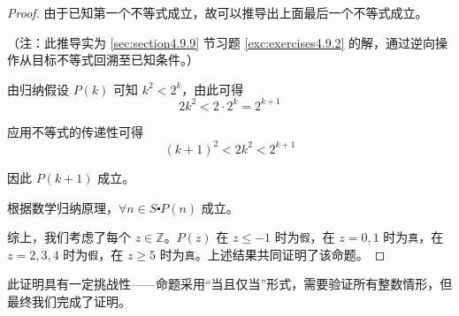 \begin{example}[比较 $2^n$ 与 $n^2$ 的大小]
\begin{proof}
        由于已知第一个不等式成立，故可以推导出上面最后一个不等式成立。

        （注：此推导实为 \ref{sec:section4.9.9} 节习题 \ref{exc:exercises4.9.2} 的解，通过逆向操作从目标不等式回溯至已知条件。）

        由归纳假设 $P(k)$ 可知 $k^2 < 2^k$，由此可得
        \[2k^2 < 2 \cdot 2^k = 2^{k+1}\]

        应用不等式的传递性可得
        \[(k + 1)^2 < 2k^2 < 2^{k+1}\]

        因此 $P(k+1)$ 成立。

        根据数学归纳原理，$\forall n \in S \centerdot P(n)$ 成立。

        综上，我们考虑了每个 $z \in \mathbb{Z}$。$P(z)$ 在 $z \le -1$ 时为\verb|假|，在 $z = 0, 1$ 时为\verb|真|，在 $z = 2, 3, 4$ 时为\verb|假|，在 $z \ge 5$ 时为\verb|真|。上述结果共同证明了该命题。
    \end{proof}
\end{example}

此证明具有一定挑战性——命题采用``当且仅当''形式，需要验证所有整数情形，但最终我们完成了证明。

\clearpage